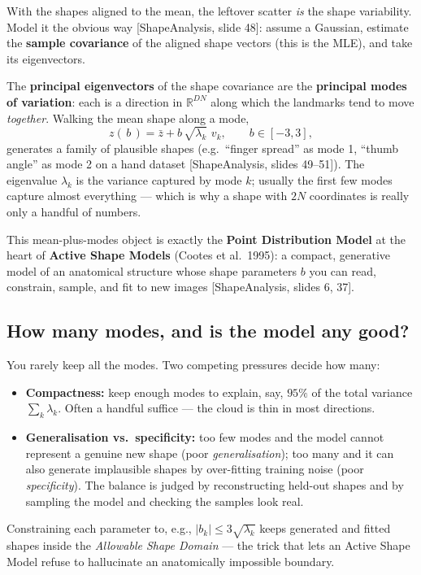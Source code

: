 \documentclass[11pt]{article}
\newcommand{\R}{\mathbb{R}}
\newcommand{\deck}[1]{\textsf{\small[#1]}}
\begin{document}
With the shapes aligned to the mean, the leftover scatter \emph{is} the shape
variability. Model it the obvious way \deck{ShapeAnalysis, slide 48}: assume a
Gaussian, estimate the \textbf{sample covariance} of the aligned shape vectors
(this is the MLE), and take its eigenvectors.

\begin{keybox}
The \textbf{principal eigenvectors} of the shape covariance are the
\textbf{principal modes of variation}: each is a direction in $\R^{DN}$ along
which the landmarks tend to move \emph{together}. Walking the mean shape along a
mode,
\[
z(\,b\,) = \bar z + b\,\sqrt{\lambda_k}\,\, v_k ,\qquad b \in [-3, 3],
\]
generates a family of plausible shapes (e.g.\ ``finger spread'' as mode 1,
``thumb angle'' as mode 2 on a hand dataset \deck{ShapeAnalysis, slides 49--51}).
The eigenvalue $\lambda_k$ is the variance captured by mode $k$; usually the
first few modes capture almost everything --- which is why a shape with $2N$
coordinates is really only a handful of numbers.
\end{keybox}

This mean-plus-modes object is exactly the \textbf{Point Distribution Model} at
the heart of \textbf{Active Shape Models} (Cootes et al.\ 1995): a compact,
generative model of an anatomical structure whose shape parameters $b$ you can
read, constrain, sample, and fit to new images \deck{ShapeAnalysis, slides 6,
37}.

\subsection{How many modes, and is the model any good?}

You rarely keep all the modes. Two competing pressures decide how many:
\begin{itemize}[nosep,leftmargin=*]
  \item \textbf{Compactness:} keep enough modes to explain, say, $95\%$ of the
  total variance $\sum_k\lambda_k$. Often a handful suffice --- the cloud is
  thin in most directions.
  \item \textbf{Generalisation vs.\ specificity:} too few modes and the model
  cannot represent a genuine new shape (poor \emph{generalisation}); too many
  and it can also generate implausible shapes by over-fitting training noise
  (poor \emph{specificity}). The balance is judged by reconstructing held-out
  shapes and by sampling the model and checking the samples look real.
\end{itemize}
Constraining each parameter to, e.g., $|b_k|\le 3\sqrt{\lambda_k}$ keeps
generated and fitted shapes inside the \emph{Allowable Shape Domain} --- the
trick that lets an Active Shape Model refuse to hallucinate an anatomically
impossible boundary.
\end{document}
